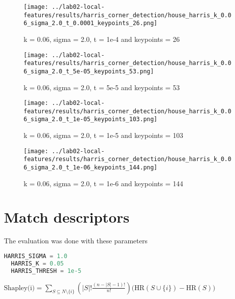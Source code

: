 \documentclass{ETHExercise}
\begin{document}
\begin{figure}[!htb]
      \texttt{[image: ../lab02-local-features/results/harris\_corner\_detection/house\_harris\_k\_0.06\_sigma\_2.0\_t\_0.0001\_keypoints\_26.png]}
      \caption{k = 0.06, sigma = 2.0, t = 1e-4 and keypoints = 26}
    \endminipage\hfill
      \texttt{[image: ../lab02-local-features/results/harris\_corner\_detection/house\_harris\_k\_0.06\_sigma\_2.0\_t\_5e-05\_keypoints\_53.png]}
      \caption{k = 0.06, sigma = 2.0, t = 5e-5 and keypoints = 53}
    \endminipage\hfill
      \texttt{[image: ../lab02-local-features/results/harris\_corner\_detection/house\_harris\_k\_0.06\_sigma\_2.0\_t\_1e-05\_keypoints\_103.png]}
      \caption{k = 0.06, sigma = 2.0, t = 1e-5 and keypoints = 103}
    \endminipage\hfill
      \texttt{[image: ../lab02-local-features/results/harris\_corner\_detection/house\_harris\_k\_0.06\_sigma\_2.0\_t\_1e-06\_keypoints\_144.png]}
      \caption{k = 0.06, sigma = 2.0, t = 1e-6 and keypoints = 144}
    \endminipage
  \end{figure}


\newpage
\section{Match descriptors}
The evaluation was done with these parameters
\begin{lstlisting}[language=Python, caption=parameters used to match descriptors]
  HARRIS_SIGMA = 1.0
  HARRIS_K = 0.05
  HARRIS_THRESH = 1e-5
\end{lstlisting}
$\text{Shapley(i)} =  \sum\limits_{S \subseteq N  \setminus \{i\}}\left(|S|! \frac{(n-|S|-1)!}{n!}\right) \Big(\text{HR}(S \cup \{i\}) - \text{HR}(S)\Big)$\\
\end{document}
